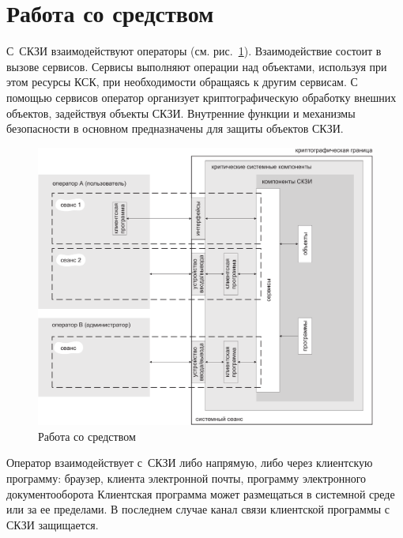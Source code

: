 \section{Работа со средством}\label{COMMON.Overview}


С~СКЗИ взаимодействуют операторы (см. рис.~\ref{Fig.COMMON.Sessions}).
%
Взаимодействие состоит в вызове сервисов.
%
Сервисы выполняют операции над объектами, используя при этом ресурсы КСК,
при необходимости обращаясь к другим сервисам.
%
С помощью сервисов оператор организует криптографическую
обработку внешних объектов, задействуя объекты СКЗИ.
%
Внутренние функции и механизмы безопасности в основном предназначены
для защиты объектов СКЗИ.

\begin{figure}[bht]
\begin{center}
\includegraphics[width=16.5cm]{../figs/sessions}
\end{center}
\caption{Работа со средством}\label{Fig.COMMON.Sessions}
\end{figure}


Оператор взаимодействует с~СКЗИ либо напрямую, 
либо через клиентскую программу: браузер, клиента электронной почты, 
программу электронного документооборота 
%
Клиентская программа может размещаться в системной среде или за ее пределами. 
%
В последнем случае канал связи клиентской программы с СКЗИ защищается. 

